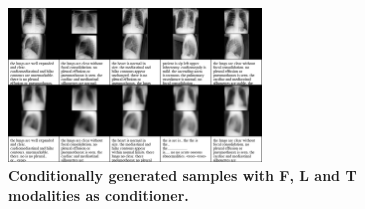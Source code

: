     
    \begin{frame}
    \begin{figure}
    \centering
    \includegraphics[width=0.6\textwidth, height = \textheight, keepaspectratio]{data/cond_gen/Lateral_PA_text}
    \caption{\textbf{Conditionally generated samples with F, L and T modalities as conditioner.}}
    \end{figure}
    \end{frame}

